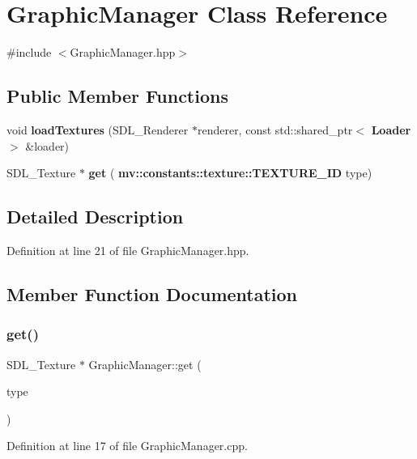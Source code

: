 \section{Graphic\+Manager Class Reference}
\label{class_graphic_manager}


{\ttfamily \#include $<$Graphic\+Manager.\+hpp$>$}

\subsection*{Public Member Functions}
\begin{DoxyCompactItemize}
\item 
void \textbf{ load\+Textures} (S\+D\+L\+\_\+\+Renderer $\ast$renderer, const std\+::shared\+\_\+ptr$<$ \textbf{ Loader} $>$ \&loader)
\item 
S\+D\+L\+\_\+\+Texture $\ast$ \textbf{ get} (\textbf{ mv\+::constants\+::texture\+::\+T\+E\+X\+T\+U\+R\+E\+\_\+\+ID} type)
\end{DoxyCompactItemize}


\subsection{Detailed Description}


Definition at line 21 of file Graphic\+Manager.\+hpp.



\subsection{Member Function Documentation}
\mbox{\label{class_graphic_manager_aa9c1139ace8b5648cdb8ecd0d38f20b1}} 
\subsubsection{get()}
{\footnotesize\ttfamily S\+D\+L\+\_\+\+Texture $\ast$ Graphic\+Manager\+::get (\begin{DoxyParamCaption}\item[{\textbf{ mv\+::constants\+::texture\+::\+T\+E\+X\+T\+U\+R\+E\+\_\+\+ID}}]{type }\end{DoxyParamCaption})}



Definition at line 17 of file Graphic\+Manager.\+cpp.

\mbox{\label{class_graphic_manager_a7c2aca98de731b86755664096f456609}} 
